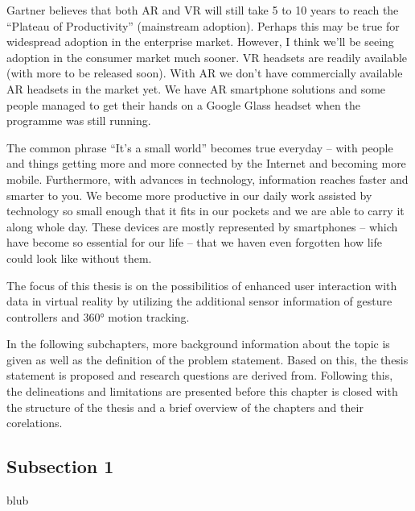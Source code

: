 Gartner believes that both AR and VR will still take 5 to 10 years to reach the “Plateau of Productivity” (mainstream adoption). Perhaps this may be true for widespread adoption in the enterprise market. However, I think we’ll be seeing adoption in the consumer market much sooner. VR headsets are readily available (with more to be released soon). With AR we don’t have commercially available AR headsets in the market yet. We have AR smartphone solutions and some people managed to get their hands on a Google Glass headset when the programme was still running.



The common phrase “It’s a small world” becomes true everyday – with people and things getting more and more connected by the Internet and becoming more mobile. Furthermore, with advances in technology, information reaches faster and smarter to you. We become more productive in our daily work assisted by technology so small enough that it fits in our pockets and we are able to carry it along whole day. These devices are mostly represented by smartphones – which have become so essential for our life – that we haven even forgotten how life could look like without them.








The focus of this thesis is on the possibilitios of enhanced user interaction with data in virtual reality by utilizing the additional sensor information of gesture controllers and 360° motion tracking.

In the following subchapters, more background information about the topic is given as well as the definition of the problem statement. Based on this, the thesis statement is proposed and research questions are derived from. Following this, the delineations and limitations are presented before this chapter is closed with the structure of the thesis and a brief overview of the chapters and their corelations.



\subsection{Subsection 1}

blub




